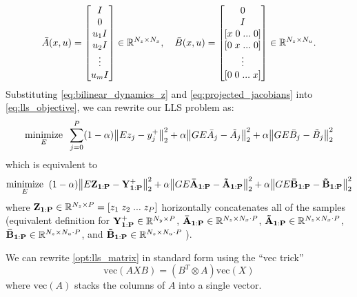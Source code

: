 \documentclass{article}
\begin{document}
\begin{equation}
    \bar{A}(x,u) =  \begin{bmatrix} 
        I \\ 0 \\ u_1 I \\ u_2 I \\ \vdots \\ u_m I 
    \end{bmatrix} \in \mathbb{R}^{N_z \times N_x}, \quad
    \bar{B}(x,u) = \begin{bmatrix} 
        0 \\ 
        I \\ 
        [x \; 0 \; ... \; 0] \\
        [0 \; x \; ... \; 0] \\
        \vdots \\
        [0 \; 0 \; ... \; x] \\
    \end{bmatrix} \in \mathbb{R}^{N_z \times N_u}.
\end{equation}
Substituting \eqref{eq:bilinear_dynamics_z} and \eqref{eq:projected_jacobians} into \eqref{eq:lls_objective},
we can rewrite our LLS problem as:
\begin{align}
    \underset{E}{\text{minimize}} \;\; 
        \sum_{j=0}^P
        (1-\alpha) \norm{E z_j - y_j^+}_2^2 + 
           \alpha  \norm{G E \bar{A}_j - \tilde{A}_j}_2^2 + 
           \alpha  \norm{G E \bar{B}_j - \tilde{B}_j}_2^2 
\end{align}
which is equivalent to
\begin{align} \label{opt:lls_matrix}
    \underset{E}{\text{minimize}} \;\; 
        (1-\alpha) \norm{E \mathbf{Z_{1:P}} - \mathbf{Y^+_{1:P}} }_2^2 + 
           \alpha  \norm{G E \mathbf{\bar{A}_{1:P}} - \mathbf{\tilde{A}_{1:P}}}_2^2 + 
           \alpha  \norm{G E \mathbf{\bar{B}_{1:P}} - \mathbf{\tilde{B}_{1:P}}}_2^2
\end{align}
where $\mathbf{Z_{1:P}} \in \mathbb{R}^{N_z \times P} = [z_1 \; z_2 \; ... \; z_P]$ horizontally concatenates all of the samples 
(equivalent definition for 
$\mathbf{Y^+_{1:P}} \in \mathbb{R}^{N_y \times P}$, 
$\mathbf{\bar{A}_{1:P}} \in \mathbb{R}^{N_z \times N_x \cdot P}$, 
$\mathbf{\tilde{A}_{1:P}} \in \mathbb{R}^{N_z \times N_x \cdot P}$,
$\mathbf{\bar{B}_{1:P}} \in \mathbb{R}^{N_z \times N_u \cdot P}$, and 
$\mathbf{\tilde{B}_{1:P}} \in \mathbb{R}^{N_z \times N_u \cdot P}$ ).

We can rewrite \eqref{opt:lls_matrix} in standard form using the ``vec trick''
\begin{equation} \label{eq:vectrick}
    \text{vec}(A X B) = (B^T \otimes A) \text{vec}(X)
\end{equation}
where $\text{vec}(A)$ stacks the columns of $A$ into a single vector.
\end{document}
